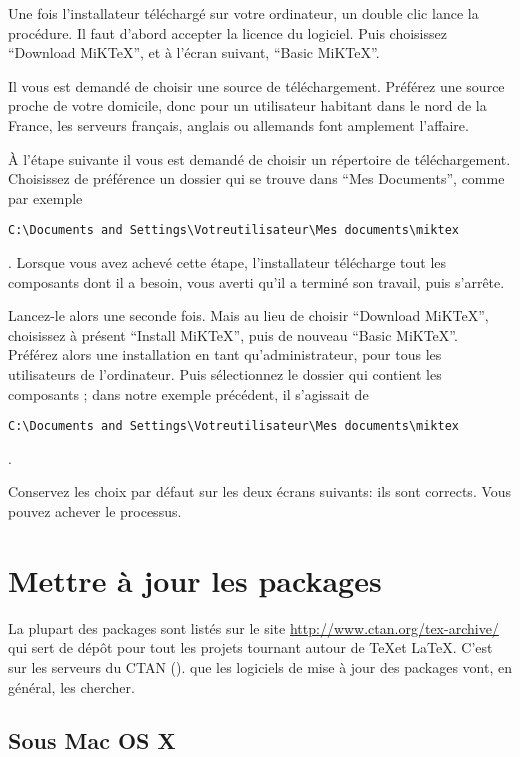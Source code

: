 Une fois l'installateur téléchargé sur votre ordinateur, un double clic lance la procédure. Il faut d'abord accepter la licence du logiciel. Puis choisissez \enquote{Download MiKTeX}, et à l'écran suivant, \enquote{Basic MiKTeX}.

Il vous est demandé de choisir une source de téléchargement. Préférez une source proche de votre domicile, donc pour un utilisateur habitant dans le nord de la France, les serveurs français, anglais ou allemands font amplement l'affaire.

À l'étape suivante il vous est demandé de choisir un répertoire de téléchargement. Choisissez de préférence un dossier qui se trouve dans \enquote{Mes Documents}, comme par exemple \begin{english}\verb|C:\Documents and Settings\Votreutilisateur\Mes documents\miktex|\end{english}. Lorsque vous avez achevé cette étape, l'installateur télécharge tout les composants dont il a besoin, vous averti qu'il a terminé son travail, puis s'arrête.

Lancez-le alors une seconde fois. Mais au lieu de choisir \enquote{Download MiKTeX}, choisissez à présent \enquote{Install MiKTeX}, puis de nouveau \enquote{Basic MiKTeX}. Préférez alors une installation en tant qu'administrateur, pour tous les utilisateurs de l'ordinateur. Puis sélectionnez le dossier qui contient les composants ; dans notre exemple précédent, il s'agissait de \begin{english}\verb|C:\Documents and Settings\Votreutilisateur\Mes documents\miktex|\end{english}.

Conservez les choix par défaut sur les deux écrans suivants: ils sont corrects. Vous pouvez achever le processus.







\section{Mettre à jour les packages}\label{maj}

La plupart des packages sont listés sur le site \url{http://www.ctan.org/tex-archive/} qui sert de dépôt pour tout les projets tournant autour de \TeX et \LaTeX. C'est sur les serveurs du CTAN (). que les logiciels de mise à jour des packages vont, en général, les chercher.

\subsection{Sous Mac OS X}\label{majosX}

